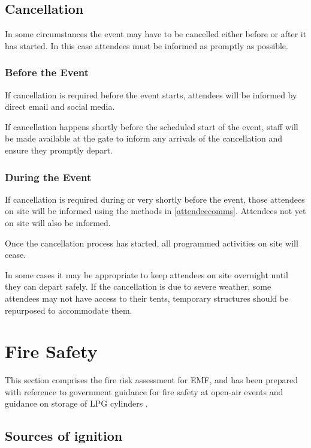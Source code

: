 \subsection{Cancellation}\label{cancellation}
In some circumstances the event may have to be cancelled either before or after it has
started. In this case attendees must be informed as promptly as possible.

\subsubsection{Before the Event}
If cancellation is required before the event starts, attendees will be informed by
direct email and social media. 

If cancellation happens shortly before the scheduled start of the event, staff will
be made available at the gate to inform any arrivals of the cancellation and ensure
they promptly depart.

\subsubsection{During the Event}
If cancellation is required during or very shortly before the event, those attendees
on site will be informed using the methods in \cref{attendeecomms}. Attendees
not yet on site will also be informed.

Once the cancellation process has started, all programmed activities on site will
cease.

In some cases it may be appropriate to keep attendees on site overnight
until they can depart safely. If the cancellation is due to severe weather, some
attendees may not have access to their tents, temporary structures should be repurposed
to accommodate them.

\newpage

\section{Fire Safety}\label{fire}

This section comprises the fire risk assessment for EMF, and has been prepared with reference
to government guidance for fire safety at open-air events \cite{firesafety} and guidance on storage
of LPG cylinders \cite{lpgstorage}.

\subsection{Sources of ignition}

